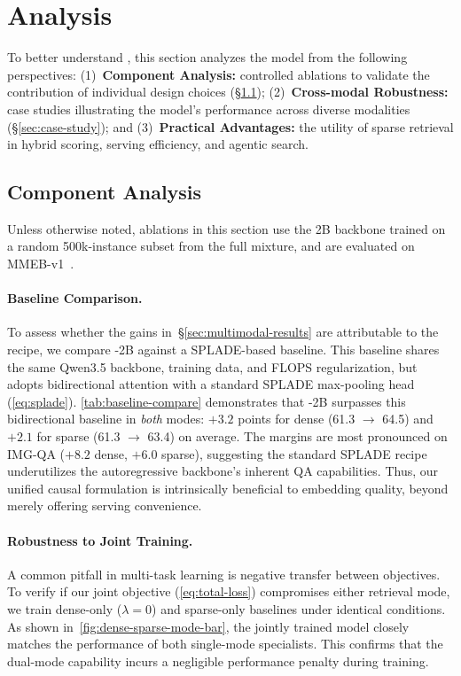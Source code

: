 \section{Analysis}\label{sec:analysis}

To better understand \ours, this section analyzes the model from the following perspectives: 
(1)~\textbf{Component Analysis:} controlled ablations to validate the contribution of individual design choices (\S\ref{sec:ablation});
(2)~\textbf{Cross-modal Robustness:} case studies illustrating the model's performance across diverse modalities (\S\ref{sec:case-study}); and
(3)~\textbf{Practical Advantages:} the utility of sparse retrieval in hybrid scoring, serving efficiency, and agentic search.

\subsection{Component Analysis} \label{sec:ablation}

Unless otherwise noted, ablations in this section use the 2B backbone trained on a random 500k-instance subset from the full mixture, and are evaluated on MMEB-v1~\citep{vlm2vec}. 
\paragraph{Baseline Comparison.}

To assess whether the gains in~\S\ref{sec:multimodal-results} are attributable to the \ours recipe, we compare \ours-2B against a SPLADE-based baseline. This baseline shares the same Qwen3.5 backbone, training data, and FLOPS regularization, but adopts bidirectional attention with a standard SPLADE max-pooling head (\autoref{eq:splade}). \autoref{tab:baseline-compare} demonstrates that \ours-2B surpasses this bidirectional baseline in \emph{both} modes: $+3.2$ points for dense (61.3 $\rightarrow$ 64.5) and $+2.1$ for sparse (61.3 $\rightarrow$ 63.4) on average. The margins are most pronounced on IMG-QA ($+8.2$ dense, $+6.0$ sparse), suggesting the standard SPLADE recipe underutilizes the autoregressive backbone's inherent QA capabilities. Thus, our unified causal formulation is intrinsically beneficial to embedding quality, beyond merely offering serving convenience. 

\paragraph{Robustness to Joint Training.}

A common pitfall in multi-task learning is negative transfer between objectives. To verify if our joint objective (\autoref{eq:total-loss}) compromises either retrieval mode, we train dense-only ($\lambda{=}0$) and sparse-only baselines under identical conditions. As shown in~\autoref{fig:dense-sparse-mode-bar}, the jointly trained \ours model closely matches the performance of both single-mode specialists. This confirms that the dual-mode capability incurs a negligible performance penalty during training. 


